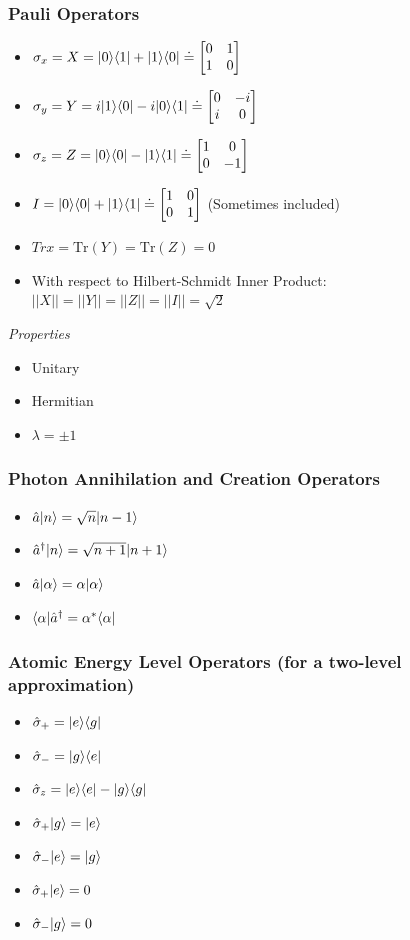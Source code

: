 \documentclass[]{report}
\DeclarePairedDelimiter\bra{\langle}{\rvert}
\DeclarePairedDelimiter\ket{\lvert}{\rangle}
\newcommand \tab[1][1cm]{\hspace*{#1}}
\newcommand{\itemt}{\item \tab}
\begin{document}
\subsubsection{Pauli Operators}
\begin{itemize}
\itemt \( \sigma_x = X = \ket{0}\bra{1} + \ket{1}\bra{0} \doteq 		
\begin{bmatrix}
0 & 1 \\
1 & 0
\end{bmatrix} \)					
\itemt \( \sigma_y = Y = i\ket{1}\bra{0} - i\ket{0}\bra{1} \doteq 
\begin{bmatrix}
0 & -i \\
i & 0
\end{bmatrix} \)					
\itemt \( \sigma_z = Z = \ket{0}\bra{0} - \ket{1}\bra{1} \doteq 
\begin{bmatrix}
1 & 0 \\
0 & -1
\end{bmatrix} \)					
\itemt \( I = \ket{0}\bra{0} + \ket{1}\bra{1} \doteq \begin{bmatrix}
1 & 0 \\
0 & 1
\end{bmatrix} \) (Sometimes included)					
\itemt \( Trx = \mathrm{Tr} (Y) = \mathrm{Tr} (Z) = 0 \)					
\itemt With respect to Hilbert-Schmidt Inner Product:
\subitem \( ||X|| = ||Y|| = ||Z|| = ||I|| = \sqrt{2} \)				
\end{itemize}

\textit{Properties}
\begin{itemize}
\itemt Unitary
\itemt Hermitian
\itemt \( \lambda = \pm 1 \)
\end{itemize}

\subsubsection{Photon Annihilation and Creation Operators}			
\begin{itemize}
\itemt \( \hat{a}\ket{n} = \sqrt{n}\ket{n-1} \)
\itemt \( \hat{a}^\dagger\ket{n} = \sqrt{n+1}\ket{n+1} \)
\itemt \( \hat{a}\ket{\alpha} = \alpha\ket{\alpha} \)
\itemt \( \bra{\alpha}\hat{a}^\dagger = \alpha^*\bra{\alpha} \)
\end{itemize}

\subsubsection{Atomic Energy Level Operators (for a two-level approximation)}	
\begin{itemize}
\itemt \( \hat{\sigma}_+ = \ket{e}\bra{g} \)
\itemt \( \hat{\sigma}_- = \ket{g}\bra{e} \)
\itemt \( \hat{\sigma}_z = \ket{e}\bra{e} - \ket{g}\bra{g} \)
\itemt \( \hat{\sigma}_+\ket{g} = \ket{e} \)
\itemt \( \hat{\sigma}_-\ket{e} = \ket{g} \)
\itemt \( \hat{\sigma}_+\ket{e} = 0 \)
\itemt \( \hat{\sigma}_-\ket{g} = 0 \)
\end{itemize}
\end{document}
